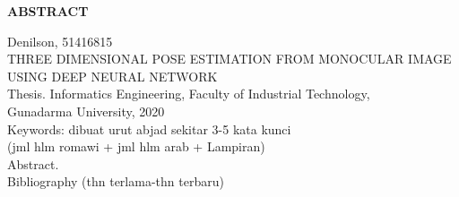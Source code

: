 \newpage %
\begin{center}
    \begin{large}\textbf{ABSTRACT}\end{large}
\end{center}

\vspace{5mm}

\noindent Denilson, 51416815 \\
THREE DIMENSIONAL POSE ESTIMATION FROM MONOCULAR IMAGE USING DEEP NEURAL NETWORK\\
Thesis. Informatics Engineering, Faculty of Industrial Technology, \\
Gunadarma University, 2020\\
Keywords: dibuat urut abjad sekitar 3-5 kata kunci\\
\noindent (jml hlm romawi + jml hlm arab + Lampiran)\\

Abstract. \\

\noindent Bibliography (thn terlama-thn terbaru)
